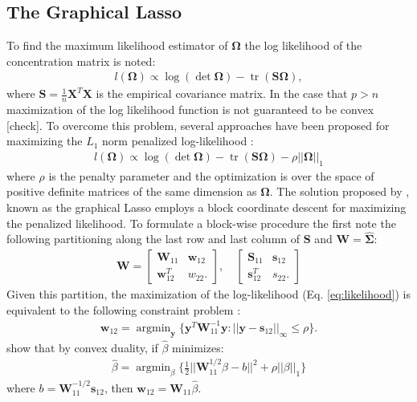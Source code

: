 \documentclass[11pt]{article}
\DeclareMathOperator{\argmin}{argmin}
\DeclareMathOperator{\tr}{tr}
\begin{document}
\subsection{The Graphical Lasso}
 To find the maximum likelihood estimator of $\boldsymbol{\Omega}$ the log likelihood of the concentration matrix is noted:
\begin{align} 
l(\boldsymbol{\Omega})\propto\log (\det \boldsymbol{\Omega})-\tr \left( \textbf{S} \boldsymbol{\Omega} \right),
\end{align}
where $\textbf{S}=\frac{1}{n}\textbf{X}^T \textbf{X}$ is the empirical covariance matrix. In the case that $p>n$ maximization of the log likelihood function is not guaranteed to be convex [check]. To overcome this problem, several approaches have been proposed for maximizing the $L_1$ norm penalized log-likelihood \citep{friedman2007,yuan2007,banerjee2008}:
\begin{align}
l(\boldsymbol{\Omega})\propto\log (\det \boldsymbol{\Omega})-\tr \left( \textbf{S} \boldsymbol{\Omega} \right)-\rho ||\boldsymbol{\Omega}||_1
\label{eq:likelihood}
\end{align}
where $\rho$ is the penalty parameter and the optimization is over the space of positive definite matrices of the same dimension as $\boldsymbol{\Omega}$.
The solution proposed by \cite{friedman2007}, known as the graphical Lasso employs a block coordinate descent for maximizing the penalized likelihood. To formulate a block-wise procedure the \cite{friedman2007} first note the following partitioning along the last row and last column of $\textbf{S}$ and $\textbf{W}=\hat{\boldsymbol{\Sigma}}$:
\begin{align}
\textbf{W}=
\begin{bmatrix}
\textbf{W}_{11} & \textbf{w}_{12} \\
\textbf{w}_{12}^T & w_{22}.
\end{bmatrix}, \quad
\begin{bmatrix}
\textbf{S}_{11} & \textbf{s}_{12} \\
\textbf{s}_{12}^T & s_{22}.
\end{bmatrix}
\end{align}  
Given this partition, the maximization of the log-likelihood (Eq. \ref{eq:likelihood}) is equivalent to the following constraint problem \cite{banerjee2008}:
\begin{align}
\textbf{w}_{12}=\argmin_{\textbf{y}} \{ \textbf{y}^T \textbf{W}_{11} ^{-1} \textbf{y} : ||\textbf{y}-\textbf{s}_{12}||_{\infty} \leq \rho \}.
\end{align}
\cite{banerjee2008} show that by convex duality, if $\hat{\beta}$ minimizes:
\begin{align}
\hat{\beta}=\argmin_{\beta} \{\frac{1}{2} ||\textbf{W}_{11}^{1/2}\beta-b||^2 +\rho ||\beta||_1 \}
\label{eq:dual}
\end{align}
where $b=\textbf{W}_{11}^{-1/2} \textbf{s}_{12}$, then $\textbf{w}_{12}=\textbf{W}_{11} \hat{\beta}$.
\end{document}
